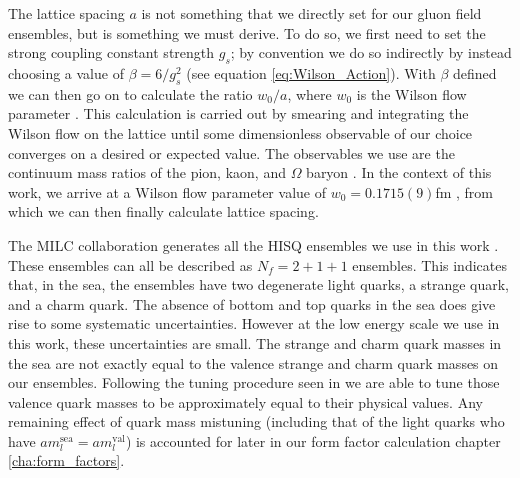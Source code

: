 The lattice spacing $a$ is not something that we directly set for our gluon field ensembles, but is something we must derive.  To do so, we first need to set the strong coupling constant strength $g_s$; by convention we do so indirectly by instead choosing a value of $\beta = 6/g_s^2$ (see equation \ref{eq:Wilson_Action}).  With $\beta$ defined we can then go on to calculate the ratio $w_0/a$, where $w_0$ is the Wilson flow parameter \cite{Borsanyi2012}.  This calculation is carried out by smearing and integrating the Wilson flow \cite{Luscher2010} on the lattice until some dimensionless observable of our choice converges on a desired or expected value.  The observables we use are the continuum mass ratios of the pion, kaon, and $\Omega$ baryon \cite{Borsanyi2012, Durr2011}.  In the context of this work, we arrive at a Wilson flow parameter value of $w_0 = 0.1715(9)$fm \cite{PhysRevD.88.074504}, from which we can then finally calculate lattice spacing.

The MILC collaboration generates all the HISQ ensembles we use in this work \cite{MILC_2010, MILC_2012, PhysRevD.93.094510, PhysRevD.98.074512}.  These ensembles can all be described as $N_f = 2+1+1$ ensembles. This indicates that, in the sea, the ensembles have two degenerate light quarks, a strange quark, and a charm quark.  The absence of bottom and top quarks in the sea does give rise to some systematic uncertainties.  However at the low energy scale we use in this work, these uncertainties are small.  The strange and charm quark masses in the sea are not exactly equal to the valence strange and charm quark masses on our ensembles.  Following the tuning procedure seen in \cite{PhysRevD.91.054508} we are able to tune those valence quark masses to be approximately equal to their physical values.  Any remaining effect of quark mass mistuning (including that of the light quarks who have $am_l^\mathrm{sea}=am_l^\mathrm{val}$) is accounted for later in our form factor calculation chapter \ref{cha:form_factors}.

